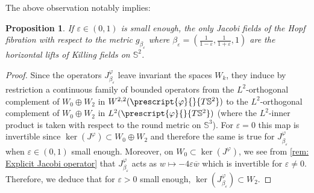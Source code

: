 \documentclass{article}
\numberwithin{equation}{section}        %
\theoremstyle{bfnote}
\newtheorem{prop}[thm]{Proposition}         %
\theoremstyle{definition}
\theoremstyle{bfremark}
\newcommand{\Sp}{\mathbb{S}}                %
\begin{document}
The above observation notably implies:

\begin{prop}        \label{prop: Jacobi fields of left-invariant metrics on S3}
    If $\varepsilon \in (0,1)$ is small enough, the only Jacobi fields of the Hopf fibration with respect to the metric $g_{\beta_\varepsilon}$ where $\beta_{\varepsilon} = (\frac{1}{1-\varepsilon},\frac{1}{1+\varepsilon},1)$ are the horizontal lifts of Killing fields on $\Sp^2$.
\end{prop}

\begin{proof}
    Since the operators $J^\varphi_{\beta_\varepsilon}$ leave invariant the spaces $W_k$, they induce by restriction a continuous family of bounded operators from the $L^2$-orthogonal complement of $W_0 \oplus W_2$ in $W^{2,2}(\prescript{\varphi}{}{T\Sp^2})$ to the $L^2$-orthogonal complement of $W_0 \oplus W_2$ in $L^2(\prescript{\varphi}{}{T\Sp^2})$ (where the $L^2$-inner product is taken with respect to the round metric on $\Sp^3$). For $\varepsilon = 0$ this map is invertible since $\ker(J^\varphi) \subset W_0 \oplus W_2$ and therefore the same is true for $J^\varphi_{\beta_\varepsilon}$ when $\varepsilon \in (0,1)$ small enough. Moreover, on $W_0 \subset \ker(J^\varphi)$, we see from \cref{rem: Explicit Jacobi operator} that $J^\varphi_{\beta_\varepsilon}$ acts as $w \mapsto -4\varepsilon \overline{w}$ which is invertible for $\varepsilon \neq 0$. Therefore, we deduce that for $\varepsilon > 0$ small enough, $\ker(J^\varphi_{\beta_\varepsilon}) \subset W_2$.
    

\end{proof}
\end{document}
